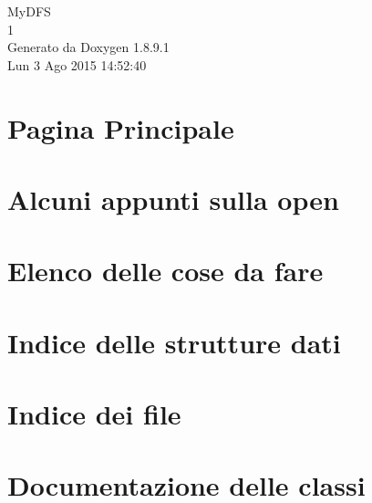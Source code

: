 \documentclass[twoside]{book}
\newcommand{\+}{\discretionary{\mbox{\scriptsize$\hookleftarrow$}}{}{}}
\newcommand{\clearemptydoublepage}{%
  \newpage{\pagestyle{empty}\cleardoublepage}%
}
\begin{document}
\hypersetup{pageanchor=false,
             bookmarks=true,
             bookmarksnumbered=true,
             pdfencoding=unicode
            }
\begin{titlepage}
\vspace*{7cm}
\begin{center}%
{\Large My\+D\+F\+S \\[1ex]\large 1 }\\
\vspace*{1cm}
{\large Generato da Doxygen 1.8.9.1}\\
\vspace*{0.5cm}
{\small Lun 3 Ago 2015 14:52:40}\\
\end{center}
\end{titlepage}
\clearemptydoublepage
\tableofcontents
\clearemptydoublepage
{}
\hypersetup{pageanchor=true}

\chapter{Pagina Principale}
\label{index}\hypertarget{index}{}
\chapter{Alcuni appunti sulla open}
\label{md_OPE}
\hypertarget{md_OPE}{}

\chapter{Elenco delle cose da fare}
\label{todo}
\hypertarget{todo}{}

\chapter{Indice delle strutture dati}

\chapter{Indice dei file}

\chapter{Documentazione delle classi}







\end{document}
